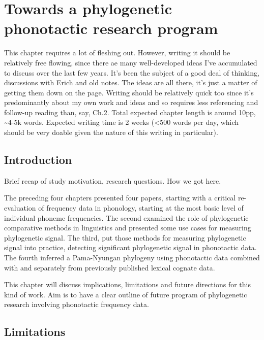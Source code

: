 \chapter[Towards phylogenetic phonotactics]{Towards a phylogenetic phonotactic research program}
\label{Chap:Discussion}

This chapter requires a lot of fleshing out. However, writing it should be relatively free flowing, since there ae many well-developed ideas I've accumulated to discuss over the last few years. It's been the subject of a good deal of thinking, discussions with Erich and old notes. The ideas are all there, it's just a matter of getting them down on the page. Writing should be relatively quick too since it's predominantly about my own work and ideas and so requires less referencing and follow-up reading than, say, Ch.2. Total expected chapter length is around 10pp, \textasciitilde{}4-5k words. Expected writing time is 2 weeks (\textless{}500 words per day, which should be very doable given the nature of this writing in particular).

\hypertarget{discussion-intro}{%
\section{Introduction}\label{discussion-intro}}

Brief recap of study motivation, research questions. How we got here.

The preceding four chapters presented four papers, starting with a critical re-evaluation of frequency data in phonology, starting at the most basic level of individual phoneme frequencies. The second examined the role of phylogenetic comparative methods in linguistics and presented some use cases for measuring phylogenetic signal. The third, put those methods for measuring phylogenetic signal into practice, detecting significant phylogenetic signal in phonotactic data. The fourth inferred a Pama-Nyungan phylogeny using phonotactic data combined with and separately from previously published lexical cognate data.

This chapter will discuss implications, limitations and future directions for this kind of work. Aim is to have a clear outline of future program of phylogenetic research involving phonotactic frequency data.

\hypertarget{limitations}{%
\section{Limitations}\label{limitations}}

